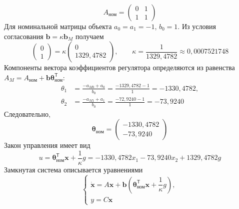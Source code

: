 \begin{equation}
  A_{\text{ном}}=\begin{pmatrix}0&1\\1&1\end{pmatrix}
\end{equation}
Для номинальной матрицы объекта $a_0=a_1=-1$, $b_0=1$.
Из условия согласования $\bm b=\kappa\bm b_M$ получаем
\begin{equation}
  \begin{pmatrix}0\\1\end{pmatrix}
  =\kappa\begin{pmatrix}0\\1329{,}4782\end{pmatrix},
  \qquad
  \kappa=\frac{1}{1329{,}4782}\approx0{,}0007521748
\end{equation}
Компоненты вектора коэффициентов регулятора определяются из равенства
$A_M=A_{\text{ном}}+\bm b\bm\theta_{\text{ном}}^{\mathsf T}$:
\begin{equation}
  \begin{aligned}
    \theta_1&=\frac{-a_{M0}+a_0}{b_0}
    =\frac{-1329{,}4782-1}{1}=-1330{,}4782,\\
    \theta_2&=\frac{-a_{M1}+a_1}{b_0}
    =\frac{-72{,}9240-1}{1}=-73{,}9240
  \end{aligned}
\end{equation}
Следовательно,
\begin{equation}
  \bm\theta_{\text{ном}}=
  \begin{pmatrix}
    -1330{,}4782\\
    -73{,}9240
  \end{pmatrix}
\end{equation}
Закон управления имеет вид
\begin{equation}
  u=\bm\theta_{\text{ном}}^{\mathsf T}\bm x+\frac{1}{\kappa}g
  =-1330{,}4782x_1-73{,}9240x_2+1329{,}4782g
\end{equation}
Замкнутая система описывается уравнениями
\begin{equation}
  \begin{cases}
    \dot{\bm x}=A\bm x+
    \bm b\left(\bm\theta_{\text{ном}}^{\mathsf T}\bm x
    +\dfrac{1}{\kappa}g\right),\\
    y=C\bm x
  \end{cases}
  \label{eq:nonadaptive-general}
\end{equation}

